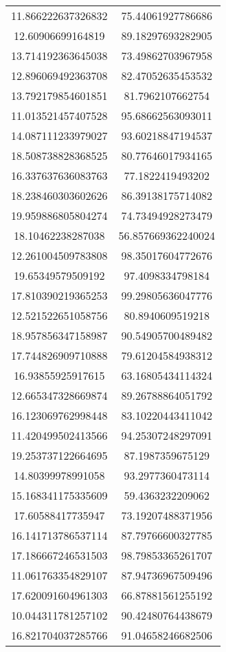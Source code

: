\begin{table}
\begin{tabular}{cc}
11.866222637326832 & 75.44061927786686 \\
12.60906699164819 & 89.18297693282905 \\
13.714192363645038 & 73.49862703967958 \\
12.896069492363708 & 82.47052635453532 \\
13.792179854601851 & 81.7962107662754 \\
11.013521457407528 & 95.68662563093011 \\
14.087111233979027 & 93.60218847194537 \\
18.508738828368525 & 80.77646017934165 \\
16.337637636083763 & 77.1822419493202 \\
18.238460303602626 & 86.39138175714082 \\
19.959886805804274 & 74.73494928273479 \\
18.10462238287038 & 56.857669362240024 \\
12.261004509783808 & 98.35017604772676 \\
19.65349579509192 & 97.4098334798184 \\
17.810390219365253 & 99.29805636047776 \\
12.521522651058756 & 80.8940609519218 \\
18.957856347158987 & 90.54905700489482 \\
17.744826909710888 & 79.61204584938312 \\
16.93855925917615 & 63.16805434114324 \\
12.665347328669874 & 89.26788864051792 \\
16.123069762998448 & 83.10220443411042 \\
11.420499502413566 & 94.25307248297091 \\
19.253737122664695 & 87.1987359675129 \\
14.80399978991058 & 93.2977360473114 \\
15.168341175335609 & 59.4363232209062 \\
17.60588417735947 & 73.19207488371956 \\
16.141713786537114 & 87.79766600327785 \\
17.186667246531503 & 98.79853365261707 \\
11.061763354829107 & 87.94736967509496 \\
17.620091604961303 & 66.87881561255192 \\
10.044311781257102 & 90.42480764438679 \\
16.821704037285766 & 91.04658246682506 \\

\end{tabular}
\end{table}

